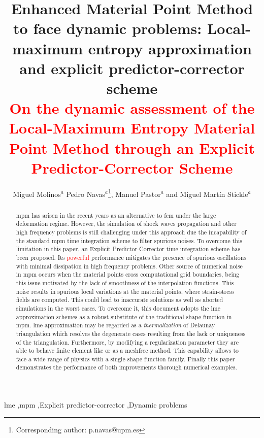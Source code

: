 \documentclass[preprint,12pt,a4paper]{elsarticle}
\newcommand{\red}[1]{
  \textcolor{red}{{#1}}
}
\begin{document}
\begin{frontmatter}

\title{Enhanced Material Point Method to face
  dynamic problems: Local-maximum entropy approximation and explicit
  predictor-corrector scheme\\
  \red{On the dynamic assessment of the Local-Maximum Entropy Material Point Method through an Explicit Predictor-Corrector Scheme}}

\author{
Miguel Molinos$^a$
Pedro Navas$^a$\footnote{Corresponding author: p.navas@upm.es},
Manuel Pastor$^a$
and Miguel Martín Stickle$^a$ 
}
\address{
  $^a$ ETSI Caminos, Canales y Puertos, Universidad Polit\'ectnica de Madrid.\\ c. Prof. Aranguren 3, 28040 Madrid, Spain
}

\begin{abstract}
  \acrfull{mpm} has arisen in the recent years as an
  alternative to \acrfull{fem} under the large
  deformation regime. However, the simulation of shock waves
  propagation and other high frequency problems is still challenging
  under this approach due the incapability of the standard \acrshort{mpm} time
  integration scheme to filter spurious noises. To overcome this
  limitation in this paper, an Explicit Predictor-Corrector time
  integration scheme has been proposed. Its \textcolor{red}{powerful}  performance
  mitigates the presence of spurious oscillations with minimal dissipation in high
  frequency problems. Other source of numerical noise in \acrshort{mpm} 
  occurs when the material points cross computational grid
  boundaries, being this issue motivated by the lack of smoothness of the interpolation
  functions. This noise results in spurious local variations at the material
  points, where strain-stress fields are computed. This could lead to inaccurate solutions as well as aborted simulations in the worst cases. To overcome it,
  this document adopts the \acrfull{lme} approximation schemes as a
  robust substitute of the traditional shape function in
  \acrshort{mpm}. \acrshort{lme} approximation may be regarded
  as a \textit{thermalization} of Delaunay triangulation which resolves the
  degenerate cases resulting from the lack or uniqueness of the
  triangulation. Furthermore, by modifying a regularization parameter they
  are able to behave finite element like or as a meshfree
  method. This capability allows to face a wide range of physics
  with a single shape function family. Finally this paper demonstrates
  the performance of both improvements thorough numerical examples.    
\end{abstract}

\begin{keyword}
  \acrshort{lme} \sep \acrshort{mpm} \sep Explicit predictor-corrector \sep Dynamic problems
\end{keyword}

\end{frontmatter}
\end{document}
